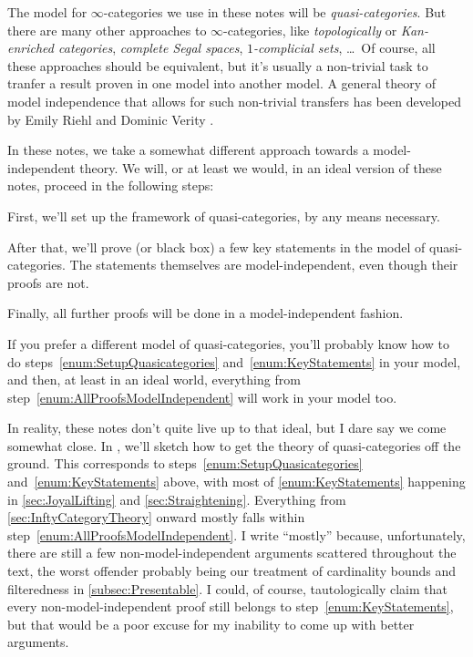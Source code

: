 \documentclass[DIV=12,numbers=enddot,leqno,bibliography=totoc]{scrartcl}
\begin{document}
	\begin{numpar}\label{par:ModelIndependenceIntro}
		The model for $\infty$-categories we use in these notes will be \emph{quasi-categories}. But there are many other approaches to $\infty$-categories, like \emph{topologically} or \emph{Kan-enriched categories}, \emph{complete Segal spaces}, \emph{$1$-complicial sets}, \ldots\ Of course, all these approaches should be equivalent, but it's usually a non-trivial task to tranfer a result proven in one model into another model. A general theory of model independence that allows for such non-trivial transfers has been developed by Emily Riehl and Dominic Verity \cite{RiehlVerity}.
		
		In these notes, we take a somewhat different approach towards a model-independent theory. We will, or at least we would, in an ideal version of these notes, proceed in the following steps:
		\begin{alphanumerate}
			\item First, we'll set up the framework of quasi-categories, by any means necessary.\label{enum:SetupQuasicategories}
			\item After that, we'll prove (or black box) a few key statements in the model of quasi-categories. The statements themselves are model-independent, even though their proofs are not.\label{enum:KeyStatements}
			\item Finally, all further proofs will be done in a model-independent fashion.\label{enum:AllProofsModelIndependent}
		\end{alphanumerate}
		If you prefer a different model of quasi-categories, you'll probably know how to do steps~\cref{enum:SetupQuasicategories} and~\cref{enum:KeyStatements} in your model, and then, at least in an ideal world, everything from step~\cref{enum:AllProofsModelIndependent} will work in your model too.
		
		In reality, these notes don't quite live up to that ideal, but I dare say we come somewhat close. In , we'll sketch how to get the theory of quasi-categories off the ground. This corresponds to steps~\cref{enum:SetupQuasicategories} and~\cref{enum:KeyStatements} above, with most of \cref{enum:KeyStatements} happening in \cref{sec:JoyalLifting} and \cref{sec:Straightening}. Everything from \cref{sec:InftyCategoryTheory} onward mostly falls within step~\cref{enum:AllProofsModelIndependent}. I write \enquote{mostly} because, unfortunately, there are still a few non-model-independent arguments scattered throughout the text, the worst offender probably being our treatment of cardinality bounds and filteredness in \cref{subsec:Presentable}. I could, of course, tautologically claim that every non-model-independent proof still belongs to step~\cref{enum:KeyStatements}, but that would be a poor excuse for my inability to come up with better arguments.
		

\end{numpar}
\end{document}

